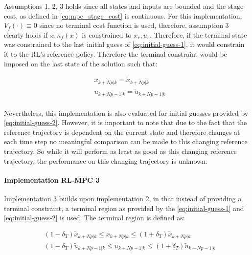 Assumptions 1, 2, 3 holds since all states and inputs are bounded and the stage cost, as defined in \autoref{eq:mpc_stage_cost} is continuous. For this implementation, $V_f(\cdot) \equiv 0$ since no terminal cost function is used, therefore, assumption 3 clearly holds if $x,\kappa_f(x)$ is constrained to $x_r,u_r$. Therefore, if the terminal state was constrained to the last initial guess of \autoref{eq:initial-guess-1}, it would constrain it to the RL's reference policy. Therefore the terminal constraint would be imposed on the last state of the solution such that:

\begin{equation}\label{eq:terminal-constraint-ocp}
\begin{aligned}
	&x_{k+Np|k} = \tilde{x}_{k+Np|k}\\ 
	&u_{k+Np-1|k} = \tilde{u}_{k+Np-1|k}\\
\end{aligned}
\end{equation}

Nevertheless, this implementation is also evaluated for initial guesses provided by \autoref{eq:initial-guess-2}. However, it is important to note that due to the fact that the reference trajectory is dependent on the current state and therefore changes at each time step no meaningful comparison can be made to this changing reference trajectory. So while it will perform as least as good as this changing reference trajectory, the performance on this changing trajectory is unknown.

\paragraph{Implementation RL-MPC 3}
Implementation 3 builds upon implementation 2, in that instead of providing a terminal constraint, a terminal region as provided by the \autoref{eq:initial-guess-1} and \autoref{eq:initial-guess-2} is used. The terminal region is defined as:

\begin{equation}\label{eq:terminal-region}
	\begin{aligned}
		& (1-\delta_T)\tilde{x}_{k+Np|k} \leq x_{k+Np|k} \leq (1+\delta_T)\tilde{x}_{k+Np|k}\\
		&(1-\delta_T)\tilde{u}_{k+Np-1|k} \leq u_{k+Np-1|k} \leq (1+\delta_T) \tilde{u}_{k+Np-1|k}\\
	\end{aligned}
\end{equation}

